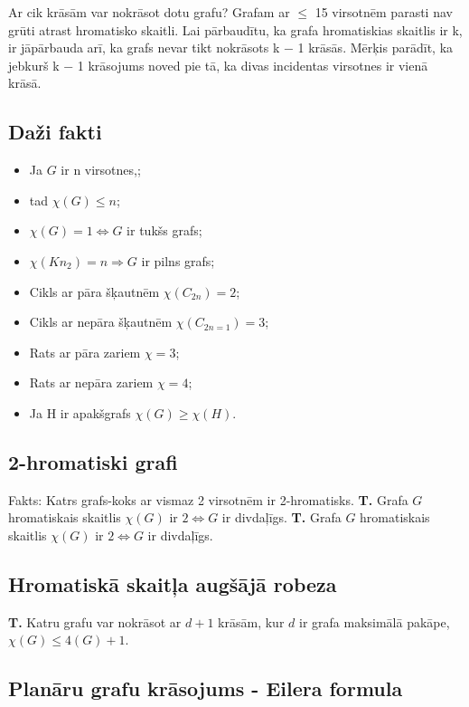 \documentclass{article}
\begin{document}
Ar cik krāsām var nokrāsot dotu grafu?  Grafam ar $\le$ 15 virsotnēm parasti nav grūti atrast hromatisko skaitli.  Lai pārbaudītu, ka grafa hromatiskias skaitlis ir k, ir jāpārbauda arī, ka grafs nevar tikt nokrāsots k − 1 krāsās.  Mērķis parādīt, ka jebkurš k − 1 krāsojums noved pie tā, ka divas incidentas virsotnes ir vienā krāsā.
 
\subsection{Daži fakti}
\begin{itemize}
	\item Ja $ G $ ir n virsotnes,;
	\item tad $\chi(G ) \le n$;
	\item $\chi(G ) = 1 \Leftrightarrow G$ ir tukšs grafs;
	\item $\chi(Kn_2 ) = n ⇒ G$ ir pilns grafs;
	\item Cikls ar pāra šķautnēm $\chi(C_{2n} ) = 2$;
	\item Cikls ar nepāra šķautnēm $\chi(C_{2n=1}) = 3$;
	\item Rats ar pāra zariem $\chi = 3$;
	\item Rats ar nepāra zariem $\chi = 4$;
	\item Ja H ir apakšgrafs $\chi(G ) \ge \chi(H)$.
\end{itemize} 

\subsection{2-hromatiski grafi}
Fakts: Katrs grafs-koks ar vismaz 2 virsotnēm ir 2-hromatisks.
\textbf{T. }Grafa $ G $ hromatiskais skaitlis $\chi(G )$ ir $2 ⇔ G$ ir divdaļīgs.
\textbf{T. }Grafa $ G $ hromatiskais skaitlis $\chi(G )$ ir $2 ⇔ G$ ir divdaļīgs.
 
\subsection{Hromatiskā skaitļa augšājā robeza}
\textbf{T. } Katru grafu var nokrāsot ar $d + 1$ krāsām, kur $d$ ir grafa maksimālā pakāpe, $\chi(G ) \le 4(G ) + 1$.

\subsection{Planāru grafu krāsojums - Eilera formula}
\end{document}
